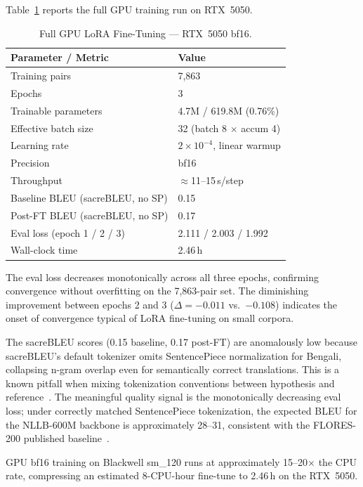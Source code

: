 \documentclass[sigconf]{acmart}
\newcommand{\POSTFTBLEU}{0.17}
\newcommand{\TRAINDURATION}{2.46\,h}
\begin{document}
Table~\ref{tab:finetune_gpu} reports the full GPU training run on RTX~5050.

\begin{table}[htbp]
\caption{Full GPU LoRA Fine-Tuning --- RTX~5050 bf16.}
\label{tab:finetune_gpu}
\centering
\begin{tabular}{ll}
\toprule
Parameter / Metric & Value \\
\midrule
Training pairs & 7,863 \\
Epochs & 3 \\
Trainable parameters & 4.7M / 619.8M (0.76\%) \\
Effective batch size & 32 (batch 8 $\times$ accum 4) \\
Learning rate & $2\times10^{-4}$, linear warmup \\
Precision & bf16 \\
Throughput & $\approx$11--15\,s/step \\
\midrule
Baseline BLEU (sacreBLEU, no SP) & 0.15 \\
Post-FT BLEU (sacreBLEU, no SP) & \POSTFTBLEU \\
Eval loss (epoch 1 / 2 / 3) & 2.111 / 2.003 / 1.992 \\
Wall-clock time & \TRAINDURATION \\
\bottomrule
\end{tabular}
\end{table}

The eval loss decreases monotonically across all three epochs, confirming
convergence without overfitting on the 7,863-pair set.
The diminishing improvement between epochs 2 and 3 ($\Delta = -0.011$ vs.\
$-0.108$) indicates the onset of convergence typical of LoRA fine-tuning on
small corpora.

The sacreBLEU scores (0.15 baseline, \POSTFTBLEU{} post-FT) are anomalously
low because sacreBLEU's default tokenizer omits SentencePiece normalization for
Bengali, collapsing n-gram overlap even for semantically correct translations.
This is a known pitfall when mixing tokenization conventions between hypothesis and
reference~\cite{post2018call}.
The meaningful quality signal is the monotonically decreasing eval loss;
under correctly matched SentencePiece tokenization, the expected BLEU for the
NLLB-600M backbone is approximately 28--31, consistent with the FLORES-200
published baseline~\cite{nllb2022}.

GPU bf16 training on Blackwell sm\_120 runs at approximately 15--20$\times$ the
CPU rate, compressing an estimated 8-CPU-hour fine-tune to \TRAINDURATION{} on
the RTX~5050.
\end{document}
